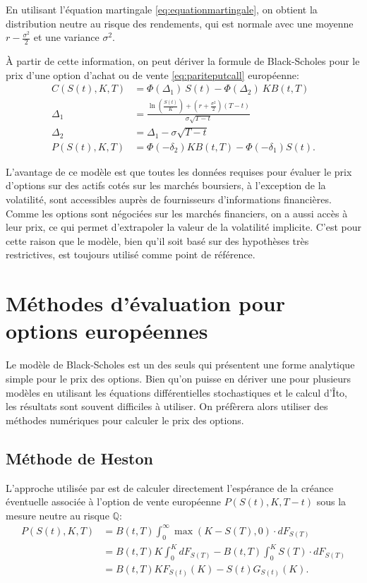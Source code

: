 En utilisant l'équation martingale \eqref{eq:equationmartingale}, on
obtient la distribution neutre au risque des rendements, qui est
normale avec une moyenne $r-\frac{\sigma^2}{2}$ et une variance
$\sigma^2$.

À partir de cette information, on peut dériver la formule de
Black-Scholes pour le prix d'une option d'achat ou de vente
\eqref{eq:pariteputcall} européenne:
\begin{align}
  \label{eq:blackscholes}
  C(S(t),K,T) &= \Phi(\Delta_1) ~ S(t) - \Phi(\Delta_2) ~ K B(t,T) \\
  \Delta_1 &= \frac{\ln\left(\frac{S(t)}{K}\right) + \left(r + \frac{\sigma^2}{2}\right)(T - t)}{\sigma\sqrt{T - t}} \nonumber\\
  \Delta_2 &= \Delta_1 - \sigma\sqrt{T - t} \nonumber\\
  P(S(t),K,T) &= \Phi(-\delta_2)K B(t,T) -
  \Phi(-\delta_1)S(t). \label{eq:putblackscholes}
\end{align}

L'avantage de ce modèle est que toutes les données requises pour
évaluer le prix d'options sur des actifs cotés sur les marchés
boursiers, à l'exception de la volatilité, sont accessibles auprès de
fournisseurs d'informations financières. Comme les options sont
négociées sur les marchés financiers, on a aussi accès à leur prix, ce
qui permet d'extrapoler la valeur de la volatilité implicite. C'est
pour cette raison que le modèle, bien qu'il soit basé sur des
hypothèses très restrictives, est toujours utilisé comme point de
référence.

\section{Méthodes d'évaluation pour options européennes}
\label{sec:methodesoptions}

Le modèle de Black-Scholes est un des seuls qui présentent une forme
analytique simple pour le prix des options. Bien qu'on puisse en
dériver une pour plusieurs modèles en utilisant les équations
différentielles stochastiques et le calcul d'Îto, les résultats sont
souvent difficiles à utiliser. On préfèrera alors utiliser des
méthodes numériques pour calculer le prix des options.

\subsection{Méthode de Heston}
\label{sec:heston1993}

L'approche utilisée par \cite{heston1993closed} est de calculer
directement l'espérance de la créance éventuelle associée à l'option
de vente européenne $P(S(t),K,T-t)$ sous la mesure neutre au risque
$\mathbb{Q}$:
\begin{align}
  P(S(t),K,T) &= B(t,T) \int_{0}^{\infty} \max\left(K-S(T),0\right)\cdot d{F}_{S(T)}  \label{eq:PutHeston93-1}\\
  &= B(t,T)K \int_{0}^{K} dF_{S(T)} - B(t,T)\int_{0}^{K} S(T)\cdot d{F}_{S(T)} \nonumber\\
  &= B(t,T)K F_{S(t)}(K) - S(t) G_{S(t)}(K). \label{eq:PutHeston93}
\end{align}

